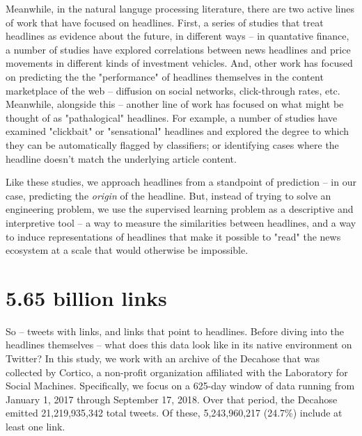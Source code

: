 \documentclass{scrartcl}
\begin{document}
Meanwhile, in the natural languge processing literature, there are two active lines of work that have focused on headlines. First, a series of studies that treat headlines as evidence about the future, in different ways -- in quantative finance, a number of studies have explored correlations between news headlines and price movements in different kinds of investment vehicles.\cite{chan2003stock}\cite{jotaki2018analyzing}\cite{meyer2017fine}\cite{ghosal2017iitp} And, other work has focused on predicting the the "performance" of headlines themselves in the content marketplace of the web -- diffusion on social networks, click-through rates, etc.\cite{kim2016compete}\cite{gabielkov2016social}\cite{piotrkowicz2017headlines}\cite{trilling2017newsworthiness}\cite{reis2015breaking} Meanwhile, alongside this -- another line of work has focused on what might be thought of as "pathalogical" headlines. For example, a number of studies have examined "clickbait"\cite{blom2015click} or "sensational"\cite{molek2013towards} headlines and explored the degree to which they can be automatically flagged by classifiers;\cite{chen2015misleading}\cite{chakraborty2016stop} or identifying cases where the headline doesn't match the underlying article content.\cite{chesney2017incongruent}\cite{ecker2014effects}\cite{wei2017learning}\cite{bourgonje2017clickbait}

Like these studies, we approach headlines from a standpoint of prediction -- in our case, predicting the \textit{origin} of the headline. But, instead of trying to solve an  engineering problem, we use the supervised learning problem as a descriptive and interpretive tool -- a way to measure the similarities between headlines, and a way to induce representations of headlines that make it possible to "read" the news ecosystem at a scale that would otherwise be impossible.

\section{5.65 billion links}

So -- tweets with links, and links that point to headlines. Before diving into the headlines themselves -- what does this data look like in its native environment on Twitter? In this study, we work with an archive of the Decahose that was collected by Cortico, a non-profit organization affiliated with the Laboratory for Social Machines. Specifically, we focus on a 625-day window of data running from January 1, 2017 through September 17, 2018. Over that period, the Decahose emitted 21,219,935,342 total tweets. Of these, 5,243,960,217 (24.7\%) include at least one link.
\end{document}
